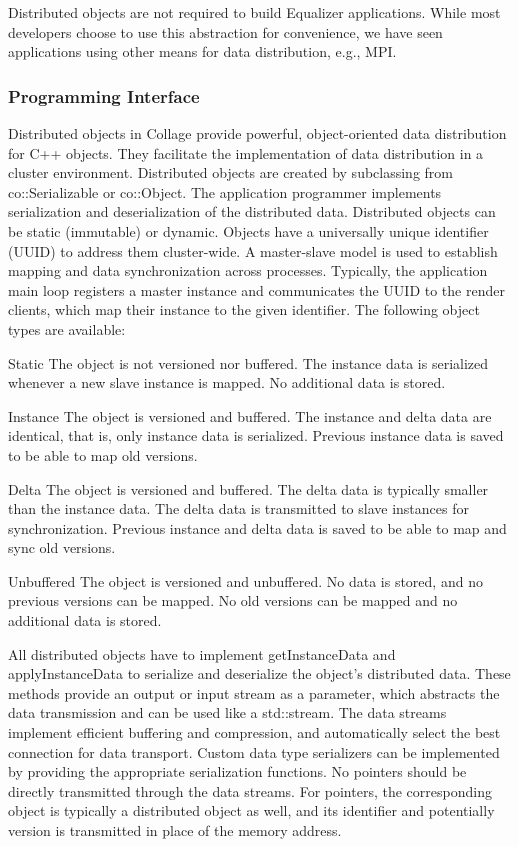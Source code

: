 \documentclass[10pt,journal,compsoc]{IEEEtran}
\begin{document}
Distributed objects are not required to build Equalizer applications. While most
developers choose to use this abstraction for convenience, we have seen
applications using other means for data distribution, e.g., MPI.

\subsubsection{Programming Interface}

Distributed objects in Collage provide powerful, object-oriented data
distribution for C++ objects. They facilitate the implementation of data
distribution in a cluster environment. Distributed objects are created by
subclassing from \textsf{co::Serializable} or \textsf{co::Object}. The
application programmer implements serialization and deserialization of the
distributed data. Distributed objects can be static (immutable) or
dynamic. Objects have a universally unique identifier (UUID) to address them
cluster-wide. A master-slave model is used to establish mapping and data
synchronization across processes. Typically, the application main loop registers
a master instance and communicates the UUID to the render clients, which map
their instance to the given identifier. The following object types are
available:

\begin{compactdesc}
\item[Static] The object is not versioned nor buffered. The instance data is
  serialized whenever a new slave instance is mapped. No additional data is
  stored.
\item[Instance] The object is versioned and buffered. The instance and delta
  data are identical, that is, only instance data is serialized. Previous
  instance data is saved to be able to map old versions.
\item[Delta] The object is versioned and buffered. The delta data is typically
  smaller than the instance data. The delta data is transmitted to slave
  instances for synchronization. Previous instance and delta data is saved to be
  able to map and sync old versions.
\item[Unbuffered] The object is versioned and unbuffered. No data is stored, and
  no previous versions can be mapped. No old versions can be mapped and no
  additional data is stored.
\end{compactdesc}

All distributed objects have to implement \textsf{getInstanceData} and
\textsf{applyInstanceData} to serialize and deserialize the object's distributed
data. These methods provide an output or input stream as a parameter, which
abstracts the data transmission and can be used like a \textsf{std::stream}.
The data streams implement efficient buffering and compression, and
automatically select the best connection for data transport. Custom data type
serializers can be implemented by providing the appropriate serialization
functions. No pointers should be directly transmitted through the data
streams. For pointers, the corresponding object is typically a distributed
object as well, and its identifier and potentially version is transmitted in
place of the memory address.
\end{document}
